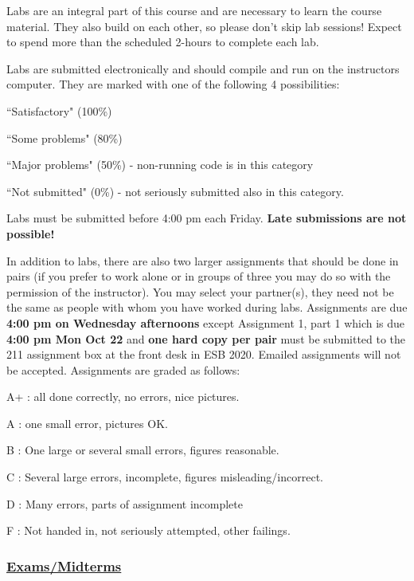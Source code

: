 \documentclass[12pt]{article}
\renewcommand{\section}[1]{\vspace{0pt}\subsubsection*{\underline{\large #1}}\vspace{-10pt}}
\newcounter{lnum}
\newenvironment{abbrevlist}%
  {\begin{list}{ }{\setlength{\leftmargin}{1em}%
               \setlength{\itemindent}{3em}%
               \setlength{\itemsep}{0pt}%
               \setlength{\parsep}{0pt}%
               \setlength{\topsep}{2pt}%
               \usecounter{lnum} } }{\end{list}}
\begin{document}
Labs are an integral part of this course and are necessary to learn the course material. They also build on each other, so please don't skip lab sessions! Expect to spend more than the scheduled 2-hours to complete each lab.

Labs are submitted electronically and should compile and run on the instructors computer. They are marked with one of the  following 4 possibilities: 

\begin{abbrevlist}
\item ``Satisfactory" (100\%)
\item ``Some problems" (80\%)
\item ``Major problems" (50\%) - non-running code is in this category
\item ``Not submitted" (0\%) - not seriously submitted also in this category.
\end{abbrevlist}

Labs must be submitted before 4:00 pm each Friday. {\bf Late submissions are not possible!}

In addition to labs, there are also two larger assignments that should be done in pairs (if you prefer to work alone or in groups of three you may do so with the permission of the instructor).  You may select your partner(s), they need not be the same as people with whom you have worked during labs.  Assignments
are due {\bf 4:00 pm on Wednesday afternoons} except Assignment 1, part 1 which is due {\bf 4:00 pm Mon Oct 22} and {\bf one hard copy per pair} must be submitted to the 211 assignment box at the front desk in ESB 2020. Emailed assignments will not 
be accepted. Assignments are graded as follows:
\begin{abbrevlist}
\item[A+] : all done correctly, no errors, nice pictures.
\item[A] : one small error, pictures OK.
\item[B] : One large or several small errors, figures reasonable.
\item[C] : Several large errors, incomplete, figures 
          misleading/incorrect.
\item[D] : Many errors, parts of assignment incomplete
\item[F] : Not handed in, not seriously attempted, other failings.
\end{abbrevlist}

\section{Exams/Midterms}
\end{document}
